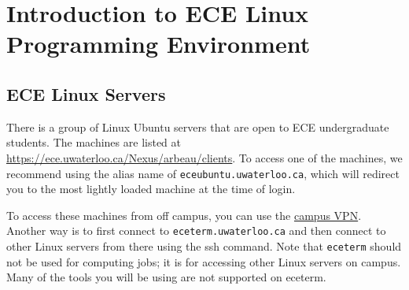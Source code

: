 \chapter{Introduction to ECE Linux Programming Environment}
\label{ch_linux_env}

\section{ECE Linux Servers}

There is a group of Linux Ubuntu servers that are open to ECE undergraduate students. The machines are listed at \url{https://ece.uwaterloo.ca/Nexus/arbeau/clients}. To access one of the machines, we recommend using the alias name of \verb+eceubuntu.uwaterloo.ca+, which will redirect you to the most lightly loaded machine at the time of login.

To access these machines from off campus, you can use the \href{https://uwaterloo.ca/information-systems-technology/services/virtual-private-network-vpn}{campus VPN}.
Another way is to first connect to \verb+eceterm.uwaterloo.ca+ and then connect to other Linux servers from there using the ssh command. Note that \verb+eceterm+ should not be used for computing jobs; it is for accessing other Linux servers on campus. Many of the tools you will be using are not supported on eceterm.

